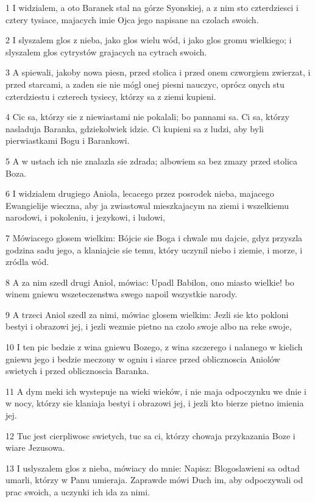 \par 1 I widzialem, a oto Baranek stal na górze Syonskiej, a z nim sto czterdziesci i cztery tysiace, majacych imie Ojca jego napisane na czolach swoich.
\par 2 I slyszalem glos z nieba, jako glos wielu wód, i jako glos gromu wielkiego; i slyszalem glos cytrystów grajacych na cytrach swoich.
\par 3 A spiewali, jakoby nowa piesn, przed stolica i przed onem czworgiem zwierzat, i przed starcami, a zaden sie nie mógl onej piesni nauczyc, oprócz onych stu czterdziestu i czterech tysiecy, którzy sa z ziemi kupieni.
\par 4 Cic sa, którzy sie z niewiastami nie pokalali; bo pannami sa. Ci sa, którzy nasladuja Baranka, gdziekolwiek idzie. Ci kupieni sa z ludzi, aby byli pierwiastkami Bogu i Barankowi.
\par 5 A w ustach ich nie znalazla sie zdrada; albowiem sa bez zmazy przed stolica Boza.
\par 6 I widzialem drugiego Aniola, lecacego przez posrodek nieba, majacego Ewangielije wieczna, aby ja zwiastowal mieszkajacym na ziemi i wszelkiemu narodowi, i pokoleniu, i jezykowi, i ludowi,
\par 7 Mówiacego glosem wielkim: Bójcie sie Boga i chwale mu dajcie, gdyz przyszla godzina sadu jego, a klaniajcie sie temu, który uczynil niebo i ziemie, i morze, i zródla wód.
\par 8 A za nim szedl drugi Aniol, mówiac: Upadl Babilon, ono miasto wielkie! bo winem gniewu wszeteczenstwa swego napoil wszystkie narody.
\par 9 A trzeci Aniol szedl za nimi, mówiac glosem wielkim: Jezli sie kto pokloni bestyi i obrazowi jej, i jezli wezmie pietno na czolo swoje albo na reke swoje,
\par 10 I ten pic bedzie z wina gniewu Bozego, z wina szczerego i nalanego w kielich gniewu jego i bedzie meczony w ogniu i siarce przed oblicznoscia Aniolów swietych i przed oblicznoscia Baranka.
\par 11 A dym meki ich wystepuje na wieki wieków, i nie maja odpoczynku we dnie i w nocy, którzy sie klaniaja bestyi i obrazowi jej, i jezli kto bierze pietno imienia jej.
\par 12 Tuc jest cierpliwosc swietych, tuc sa ci, którzy chowaja przykazania Boze i wiare Jezusowa.
\par 13 I uslyszalem glos z nieba, mówiacy do mnie: Napisz: Blogoslawieni sa odtad umarli, którzy w Panu umieraja. Zaprawde mówi Duch im, aby odpoczywali od prac swoich, a uczynki ich ida za nimi.
